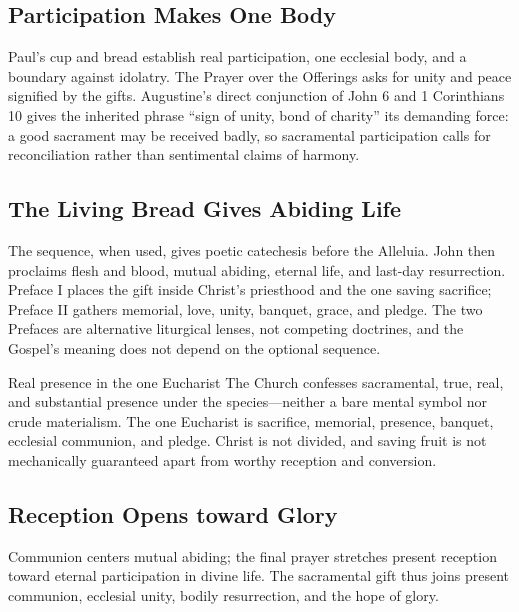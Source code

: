 \subsection*{Participation Makes One Body\enspace{}}

Paul's cup and bread establish real participation, one ecclesial body, and a boundary against idolatry. The Prayer over the Offerings asks for unity and peace signified by the gifts. Augustine's direct conjunction of John 6 and 1 Corinthians 10 gives the inherited phrase “sign of unity, bond of charity” its demanding force: a good sacrament may be received badly, so sacramental participation calls for reconciliation rather than sentimental claims of harmony.

\subsection*{The Living Bread Gives Abiding Life\enspace{}}

The sequence, when used, gives poetic catechesis before the Alleluia. John then proclaims flesh and blood, mutual abiding, eternal life, and last-day resurrection. Preface I places the gift inside Christ's priesthood and the one saving sacrifice; Preface II gathers memorial, love, unity, banquet, grace, and pledge. The two Prefaces are alternative liturgical lenses, not competing doctrines, and the Gospel's meaning does not depend on the optional sequence.

\begin{studybox}{Real presence in the one Eucharist}
The Church confesses sacramental, true, real, and substantial presence under the species---neither a bare mental symbol nor crude materialism. The one Eucharist is sacrifice, memorial, presence, banquet, ecclesial communion, and pledge. Christ is not divided, and saving fruit is not mechanically guaranteed apart from worthy reception and conversion.
\end{studybox}

\subsection*{Reception Opens toward Glory\enspace{}}

Communion centers mutual abiding; the final prayer stretches present reception toward eternal participation in divine life. The sacramental gift thus joins present communion, ecclesial unity, bodily resurrection, and the hope of glory.
